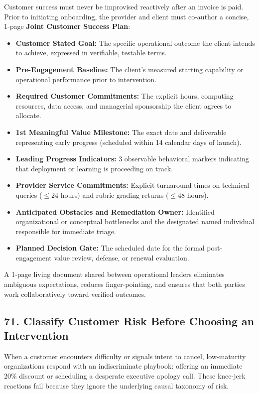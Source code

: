 Customer success must never be improvised reactively after an invoice is paid. Prior to initiating onboarding, the provider and client must co-author a concise, 1-page \textbf{Joint Customer Success Plan}:

\begin{itemize}[leftmargin=*]
\item \textbf{Customer Stated Goal:} The specific operational outcome the client intends to achieve, expressed in verifiable, testable terms.
\item \textbf{Pre-Engagement Baseline:} The client's measured starting capability or operational performance prior to intervention.
\item \textbf{Required Customer Commitments:} The explicit hours, computing resources, data access, and managerial sponsorship the client agrees to allocate.
\item \textbf{1st Meaningful Value Milestone:} The exact date and deliverable representing early progress (scheduled within 14 calendar days of launch).
\item \textbf{Leading Progress Indicators:} 3 observable behavioral markers indicating that deployment or learning is proceeding on track.
\item \textbf{Provider Service Commitments:} Explicit turnaround times on technical queries ($\le 24$ hours) and rubric grading returns ($\le 48$ hours).
\item \textbf{Anticipated Obstacles and Remediation Owner:} Identified organizational or conceptual bottlenecks and the designated named individual responsible for immediate triage.
\item \textbf{Planned Decision Gate:} The scheduled date for the formal post-engagement value review, defense, or renewal evaluation.
\end{itemize}

A 1-page living document shared between operational leaders eliminates ambiguous expectations, reduces finger-pointing, and ensures that both parties work collaboratively toward verified outcomes.

\subsection*{71. Classify Customer Risk Before Choosing an Intervention}

When a customer encounters difficulty or signals intent to cancel, low-maturity organizations respond with an indiscriminate playbook: offering an immediate 20\% discount or scheduling a desperate executive apology call. These knee-jerk reactions fail because they ignore the underlying causal taxonomy of risk.

